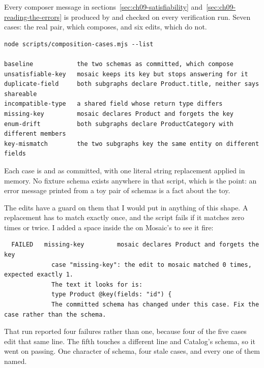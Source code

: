 %
Every composer message in sections~\ref{sec:ch09-satisfiability}
and~\ref{sec:ch09-reading-the-errors} is produced by
 and checked on every verification run.
Seven cases: the real pair, which composes, and six edits, which do not.

\begin{verbatim}
node scripts/composition-cases.mjs --list

baseline            the two schemas as committed, which compose
unsatisfiable-key   mosaic keeps its key but stops answering for it
duplicate-field     both subgraphs declare Product.title, neither says shareable
incompatible-type   a shared field whose return type differs
missing-key         mosaic declares Product and forgets the key
enum-drift          both subgraphs declare ProductCategory with different members
key-mismatch        the two subgraphs key the same entity on different fields
\end{verbatim}

%
Each case is  and  as
committed, with one literal string replacement applied in memory. No fixture
schema exists anywhere in that script, which is the point: an error message
printed from a toy pair of schemas is a fact about the toy.

The edits have a guard on them that I would put in anything of this shape. A
replacement has to match exactly once, and the script fails if it matches zero
times or twice. I added a space inside the  on Mosaic's
 to see it fire:

\begin{verbatim}
  FAILED   missing-key         mosaic declares Product and forgets the key
             case "missing-key": the edit to mosaic matched 0 times, expected exactly 1.
             The text it looks for is:
             type Product @key(fields: "id") {
             The committed schema has changed under this case. Fix the case rather than the schema.
\end{verbatim}

That run reported four failures rather than one, because four of the five cases
edit that same line. The fifth touches a different line and Catalog's schema, so
it went on passing. One character of schema, four stale cases, and every one of
them named.

